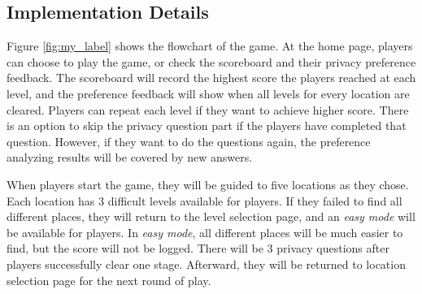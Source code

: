 \documentclass[a4paper,11pt]{article}
\begin{document}

\subsection{Implementation Details}

Figure \ref{fig:my_label} shows the flowchart of the game. At the home page, players can choose to play the game, or check the scoreboard and their privacy preference feedback. The scoreboard will record the highest score the players reached at each level, and the preference feedback will show when all levels for every location are cleared. Players can repeat each level if they want to achieve higher score. There is an option to skip the privacy question part if the players have completed that question. However, if they want to do the questions again, the preference analyzing results will be covered by new answers.

When players start the game, they will be guided to five locations as they chose. Each location has 3 difficult levels available for players. If they failed to find all different places, they will return to the level selection page, and an \textit{easy mode} will be available for players. In \textit{easy mode}, all different places will be much easier to find, but the score will not be logged. There will be 3 privacy questions after players successfully clear one stage. Afterward, they will be returned to location selection page for the next round of play.
\end{document}
